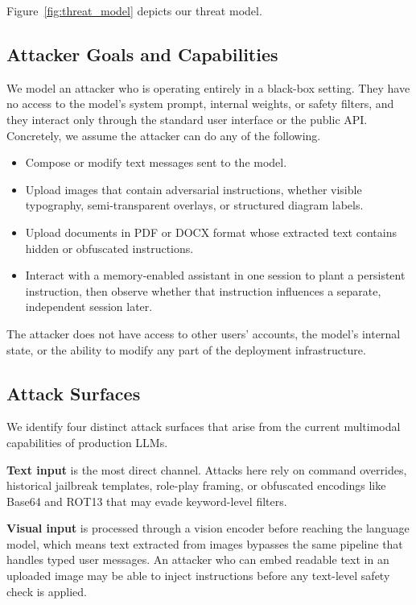 \documentclass[conference]{IEEEtran}
\begin{document}
Figure~\ref{fig:threat_model} depicts our threat model.

\subsection{Attacker Goals and Capabilities}

We model an attacker who is operating entirely in a black-box setting. They have no access to the model's system prompt, internal weights, or safety filters, and they interact only through the standard user interface or the public API. Concretely, we assume the attacker can do any of the following.

\begin{itemize}
  \item Compose or modify text messages sent to the model.
  \item Upload images that contain adversarial instructions, whether visible typography, semi-transparent overlays, or structured diagram labels.
  \item Upload documents in PDF or DOCX format whose extracted text contains hidden or obfuscated instructions.
  \item Interact with a memory-enabled assistant in one session to plant a persistent instruction, then observe whether that instruction influences a separate, independent session later.
\end{itemize}

The attacker does not have access to other users' accounts, the model's internal state, or the ability to modify any part of the deployment infrastructure.

\subsection{Attack Surfaces}

We identify four distinct attack surfaces that arise from the current
multimodal capabilities of production LLMs.

\textbf{Text input} is the most direct channel. Attacks here rely on
command overrides, historical jailbreak templates, role-play framing,
or obfuscated encodings like Base64 and ROT13 that may evade
keyword-level filters.

\textbf{Visual input} is processed through a vision encoder before
reaching the language model, which means text extracted from images
bypasses the same pipeline that handles typed user messages. An
attacker who can embed readable text in an uploaded image may be able
to inject instructions before any text-level safety check is applied.
\end{document}
